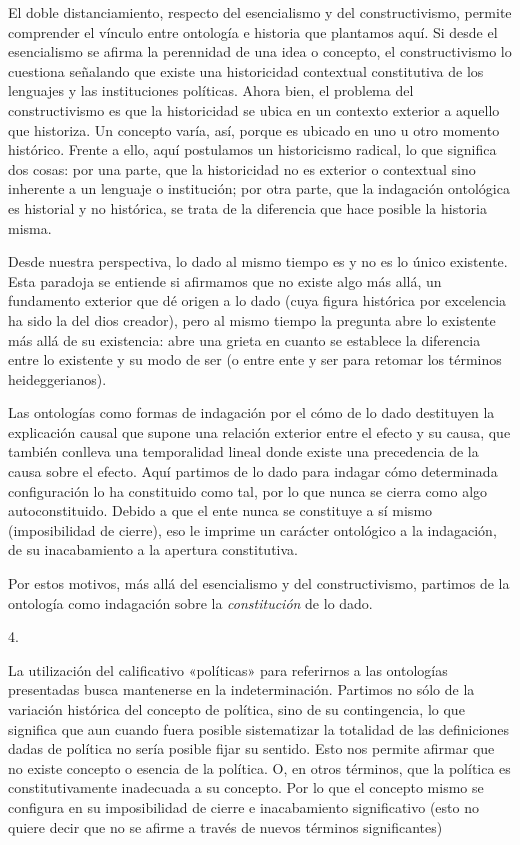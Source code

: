 El doble distanciamiento, respecto del esencialismo y del constructivismo, permite comprender el vínculo entre ontología e historia que plantamos aquí. Si desde el esencialismo se afirma la perennidad de una idea o concepto, el constructivismo lo cuestiona señalando que existe una historicidad contextual constitutiva de los lenguajes y las instituciones políticas. Ahora bien, el problema del constructivismo es que la historicidad se ubica en un contexto exterior a aquello que historiza. Un concepto varía, así, porque es ubicado en uno u otro momento histórico. Frente a ello, aquí postulamos un historicismo radical, lo que significa dos cosas: por una parte, que la historicidad no es exterior o contextual sino inherente a un lenguaje o institución; por otra parte, que la indagación ontológica es historial y no histórica, se trata de la diferencia que hace posible la historia misma.

Desde nuestra perspectiva, lo dado al mismo tiempo es y no es lo único existente. Esta paradoja se entiende si afirmamos que no existe algo más allá, un fundamento exterior que dé origen a lo dado (cuya figura histórica por excelencia ha sido la del dios creador), pero al mismo tiempo la pregunta abre lo existente más allá de su existencia: abre una grieta en cuanto se establece la diferencia entre lo existente y su modo de ser (o entre ente y ser para retomar los términos heideggerianos).

Las ontologías como formas de indagación por el cómo de lo dado destituyen la explicación causal que supone una relación exterior entre el efecto y su causa, que también conlleva una temporalidad lineal donde existe una precedencia de la causa sobre el efecto. Aquí partimos de lo dado para indagar cómo determinada configuración lo ha constituido como tal, por lo que nunca se cierra como algo autoconstituido. Debido a que el ente nunca se constituye a sí mismo (imposibilidad de cierre), eso le imprime un carácter ontológico a la indagación, de su inacabamiento a la apertura constitutiva.

Por estos motivos, más allá del esencialismo y del constructivismo, partimos de la ontología como indagación sobre la \emph{constitución }de lo dado.

4.

La utilización del calificativo «políticas» para referirnos a las ontologías presentadas busca mantenerse en la indeterminación. Partimos no sólo de la variación histórica del concepto de política, sino de su contingencia, lo que significa que aun cuando fuera posible sistematizar la totalidad de las definiciones dadas de política no sería posible fijar su sentido. Esto nos permite afirmar que no existe concepto o esencia de la política. O, en otros términos, que la política es constitutivamente inadecuada a su concepto. Por lo que el concepto mismo se configura en su imposibilidad de cierre e inacabamiento significativo (esto no quiere decir que no se afirme a través de nuevos términos significantes)

